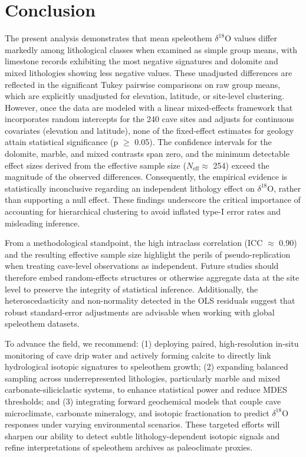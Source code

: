 \documentclass[sn-basic,Numbered]{sn-jnl}%
\begin{document}
\section{Conclusion}
\label{sec:conclusion}
The present analysis demonstrates that mean speleothem $\delta^{18}\text{O}$ values differ markedly among lithological classes when examined as simple group means, with limestone records exhibiting the most negative signatures and dolomite and mixed lithologies showing less negative values. These unadjusted differences are reflected in the significant Tukey pairwise comparisons on raw group means, which are explicitly unadjusted for elevation, latitude, or site-level clustering. However, once the data are modeled with a linear mixed-effects framework that incorporates random intercepts for the 240 cave sites and adjusts for continuous covariates (elevation and latitude), none of the fixed-effect estimates for geology attain statistical significance (p $\ge$ 0.05). The confidence intervals for the dolomite, marble, and mixed contrasts span zero, and the minimum detectable effect sizes derived from the effective sample size ($N_{\text{eff}}\approx$ 254) exceed the magnitude of the observed differences. Consequently, the empirical evidence is statistically inconclusive regarding an independent lithology effect on $\delta^{18}\text{O}$, rather than supporting a null effect. These findings underscore the critical importance of accounting for hierarchical clustering to avoid inflated type-I error rates and misleading inference.

From a methodological standpoint, the high intraclass correlation (ICC $\approx$ 0.90) and the resulting effective sample size highlight the perils of pseudo-replication when treating cave-level observations as independent. Future studies should therefore embed random-effects structures or otherwise aggregate data at the site level to preserve the integrity of statistical inference. Additionally, the heteroscedasticity and non-normality detected in the OLS residuals suggest that robust standard-error adjustments are advisable when working with global speleothem datasets.

To advance the field, we recommend: (1) deploying paired, high-resolution in-situ monitoring of cave drip water and actively forming calcite to directly link hydrological isotopic signatures to speleothem growth; (2) expanding balanced sampling across underrepresented lithologies, particularly marble and mixed carbonate-siliciclastic systems, to enhance statistical power and reduce MDES thresholds; and (3) integrating forward geochemical models that couple cave microclimate, carbonate mineralogy, and isotopic fractionation to predict $\delta^{18}\text{O}$ responses under varying environmental scenarios. These targeted efforts will sharpen our ability to detect subtle lithology-dependent isotopic signals and refine interpretations of speleothem archives as paleoclimate proxies.
\end{document}
